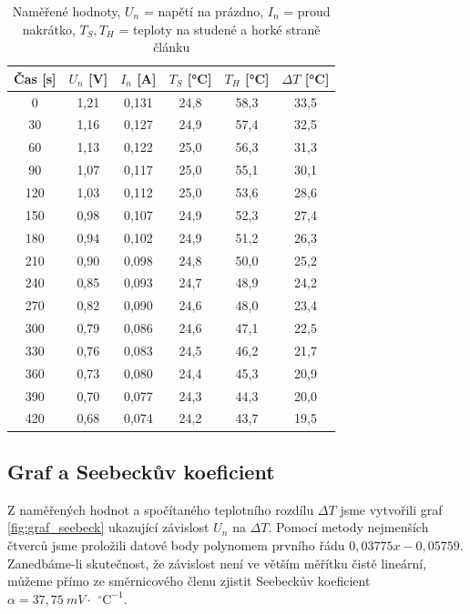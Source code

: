 \documentclass[a4paper,12pt]{article}
\newcommand{\unitC}{\,^\circ\mathrm{C}}
\begin{document}
\begin{table}[H]
\centering
\renewcommand{\arraystretch}{1.5}
\begin{tabular}{|c|c|c|c|c|c|}
\hline
Čas \textbf{[s]} & \textbf{$U_n$ [V]} & \textbf{$I_n$ [A]} & \textbf{$T_S$ [°C]} & \textbf{$T_H$ [°C]} & \textbf{$\Delta T$ [°C]} \\
\hline
0   & 1,21 & 0,131 & 24,8 & 58,3 & 33,5 \\
30  & 1,16 & 0,127 & 24,9 & 57,4 & 32,5 \\
60  & 1,13 & 0,122 & 25,0 & 56,3 & 31,3 \\
90  & 1,07 & 0,117 & 25,0 & 55,1 & 30,1 \\
120 & 1,03 & 0,112 & 25,0 & 53,6 & 28,6 \\
150 & 0,98 & 0,107 & 24,9 & 52,3 & 27,4 \\
180 & 0,94 & 0,102 & 24,9 & 51,2 & 26,3 \\
210 & 0,90 & 0,098 & 24,8 & 50,0 & 25,2 \\
240 & 0,85 & 0,093 & 24,7 & 48,9 & 24,2 \\
270 & 0,82 & 0,090 & 24,6 & 48,0 & 23,4 \\
300 & 0,79 & 0,086 & 24,6 & 47,1 & 22,5 \\
330 & 0,76 & 0,083 & 24,5 & 46,2 & 21,7 \\
360 & 0,73 & 0,080 & 24,4 & 45,3 & 20,9 \\
390 & 0,70 & 0,077 & 24,3 & 44,3 & 20,0 \\
420 & 0,68 & 0,074 & 24,2 & 43,7 & 19,5 \\
\hline
\end{tabular}
\caption{Naměřené hodnoty, $U_n$ = napětí na prázdno, $I_n$ = proud nakrátko, $T_S, T_H$ = teploty na studené a horké straně článku}
\label{tab:teg_values_teg}
\end{table}

\subsection{Graf a Seebeckův koeficient}
Z naměřených hodnot a spočítaného teplotního rozdílu $\Delta T$ jsme vytvořili graf \ref{fig:graf_seebeck} ukazující závislost $U_n$ na $\Delta T$. Pomocí metody nejmenších čtverců jsme proložili datové body polynomem prvního řádu $0,03775 x - 0,05759$. Zanedbáme-li skutečnost, že závislost není ve větším měřítku čistě lineární, můžeme přímo ze směrnicového členu zjistit Seebeckův koeficient $\alpha=37,75\ \unit{mV}\cdot~\unitC^{-1}.$
\end{document}
